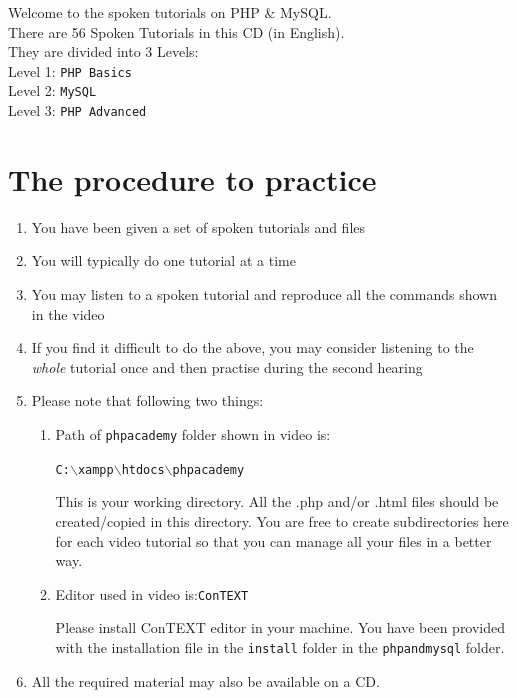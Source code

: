 \documentclass[11pt]{article}
\newenvironment{enumcpt}{\begin{enumerate} \topsep 0pt \partopsep 0pt 
                        \parsep 0pt
                        \itemsep 0pt \leftmargin -1in \rightmargin 0pt
                        }{\end{enumerate}}
\begin{document}
\begin{multicols}{2}
Welcome to the spoken tutorials on PHP \& MySQL.\\
There are 56 Spoken Tutorials in this CD (in English). \\
They are divided into 3 Levels:\\
Level 1: {\tt PHP Basics}\\
Level 2: {\tt MySQL}\\
Level 3: {\tt PHP Advanced}

\section{The procedure to practice}
\begin{enumcpt}
\item You have been given a set of spoken tutorials and files
\item You will typically do one tutorial at a time
\item You may listen to a spoken tutorial and reproduce all the commands shown in the video
\item If you find it difficult to do the above, you may consider
  listening to the \emph{whole} tutorial once and then practise during
  the second hearing
\item Please note that following two things:
\begin{enumcpt}
\item Path of {\tt phpacademy} folder shown in video is:

{\tt C:$\backslash$xampp$\backslash$htdocs$\backslash$phpacademy}

This is your working directory. All the .php and/or .html files should be created/copied in this directory. You are free to create subdirectories here for each video tutorial so that you can manage all your files in a better way.

\item Editor used in video is:{\tt ConTEXT}

Please install ConTEXT editor in your machine.  You have been provided with the installation file in the {\tt install} folder in the {\tt phpandmysql} folder.
\end{enumcpt}
\item All the required material may also be available on a CD.
\end{enumcpt}


\end{multicols}
\end{document}
